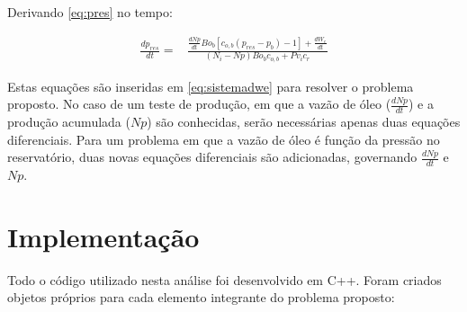 \documentclass[final,5p]{elsarticle}
\numberwithin{equation}{section}
\begin{document}
        Derivando \ref{eq:pres} no tempo:

        \begin{align}
            \frac{dp_{res}}{dt} =& \frac{\frac{dNp}{dt} Bo_b [c_{o,b}(p_{res}-p_b) - 1] + \frac{dW_e}{dt}}{(N_i - Np) Bo_b c_{o,b} + Pv_i c_r} \label{eq:dpresdt}
        \end{align}

        Estas equações são inseridas em \ref{eq:sistemadwe} para resolver o problema proposto. No caso de um teste de produção, em que a vazão de óleo ($\frac{dNp}{dt}$) e a produção acumulada ($Np$) são conhecidas, serão necessárias apenas duas equações diferenciais. Para um problema em que a vazão de óleo é função da pressão no reservatório, duas novas equações diferenciais são adicionadas, governando $\frac{dNp}{dt}$ e $Np$.

\section{Implementação} \label{sec:implementacao}

        Todo o código utilizado nesta análise foi desenvolvido em C++. Foram criados objetos próprios para cada elemento integrante do problema proposto:
\end{document}
